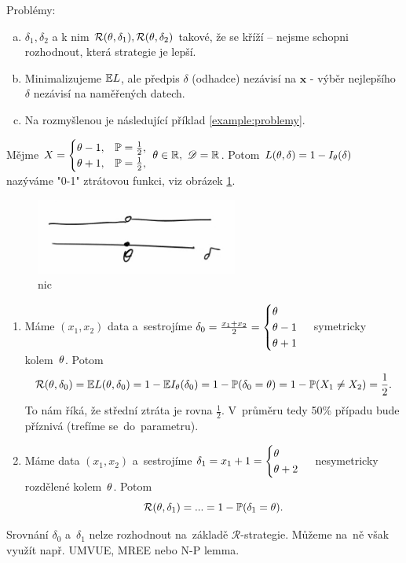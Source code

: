 \begin{description}
Problémy: \begin{enumerate}[a)]
	\item $\delta_1,\delta_2$ a k nim $\mathcal{R}(\theta,\delta_1),\mathcal{R}(\theta,\delta_2)$ takové, že se kříží -- nejsme schopni rozhodnout, která strategie je lepší.
	\item Minimalizujeme $\mathbb{E} L$, ale předpis $\delta$ (odhadce) nezávisí na $\textbf{x}$ - výběr nejlepšího $\delta$ nezávisí na naměřených datech.
	\item Na rozmyšlenou je následující příklad \ref{example:problemy}.
\end{enumerate}
\end{description}

\begin{example} \label{example:problemy}
	Mějme $X=\begin{cases}
	\theta-1,& \mathbb{P}=\frac{1}{2}, \\ \theta+1,& \mathbb{P}=\frac{1}{2},
	\end{cases}~\theta\in\mathbb{R},~\mathscr{D}=\mathbb{R}$. Potom
	$ L(\theta,\delta)=1-I_\theta(\delta)$ nazýváme "0-1" ztrátovou funkci, viz obrázek \ref{fig:p42}.
	\begin{figure}[h]
		\centering
		\includegraphics[width=0.4\linewidth]{pictures/P4_2}
		\caption{nic}
		\label{fig:p42}
	\end{figure}
	\begin{enumerate}[1)]
		\item Máme $(x_1,x_2)$ data a~sestrojíme $\delta_0=\frac{x_1+x_2}{2}=\begin{cases}
		\theta\\\theta-1\\\theta+1
		\end{cases}$ symetricky kolem~$\theta$. Potom
		$$ \mathcal{R}(\theta,\delta_0)=\mathbb{E} L(\theta,\delta_0)=1-\mathbb{E} I_\theta(\delta_0)=1-\mathbb{P}(\delta_0=\theta)=1-\mathbb{P}(X_1\neq X_2)=\frac{1}{2}.$$ To nám říká, že střední ztráta je rovna $\frac{1}{2}$. V~průměru tedy 50\% případu bude příznivá (trefíme se~do~parametru).
		\item Máme data $(x_1,x_2)$ a~sestrojíme $\delta_1=x_1+1=\begin{cases}
		\theta\\\theta+2
		\end{cases}$ nesymetricky rozdělené kolem~$\theta$. Potom
		$$\mathcal{R}(\theta,\delta_1)=...=1-\mathbb{P}(\delta_1=\theta).$$
	\end{enumerate}
Srovnání $\delta_0$ a~$\delta_1$ nelze rozhodnout na~základě $\mathcal{R}$-strategie. Můžeme na~ně však využít např. UMVUE, MREE nebo N-P lemma.
\end{example}
